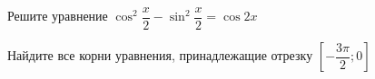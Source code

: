 \begin{ex}
	\begin{condition}
		\begin{enumcols}[label=\asbuk*)]
			\item Решите уравнение \( \cos^2 {\dfrac{x}{2}} - \sin^2 {\dfrac{x}{2}} =\cos 2x  \)
			\item Найдите все корни уравнения, принадлежащие отрезку \(  \left[-\dfrac{3\pi}{2};0\right]  \)
		\end{enumcols}
	\end{condition}
\end{ex}